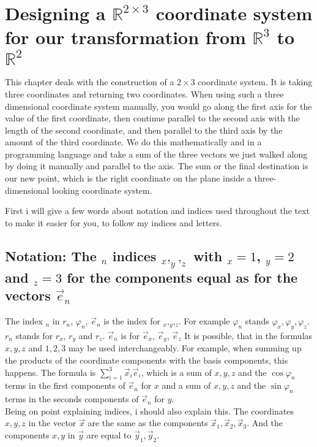 \documentclass[a4paper]{article}
\begin{document}
\section{Designing a $\mathbb{R}^{2\times{3}}$ coordinate system for our transformation from $\mathbb{R}^{3}$ to $\mathbb{R}^{2}$}

This chapter deals with the construction of a $2 \times 3$ coordinate system. It is taking three coordinates and returning two coordinates. When using such a three dimensional coordinate system manually, you would go along the first axis for the value of the first coordinate, then continue parallel to the second axis with the length of the second coordinate, and then parallel to the third axis by the amount of the third coordinate. We do this mathematically and in a programming language and take a sum of the three vectors we just walked along by doing it manually and parallel to the axis. The sum or the final destination is our new point, which is the right coordinate on the plane inside a three-dimensional looking coordinate system.

First i will give a few words about notation and indices used throughout the text to make it easier for you, to follow my indices and letters.

\subsection{Notation: The $_{n}$ indices $_x,_y,_z$ with $_x=1$, $_y=2$ and $_z=3$ for the components equal as for the vectors $\vec{e}_n$}

The index $_{n}$ in $r_{n}$, $\varphi_{n}$, $\vec{e}_{n}$ is the index for $_x$,$_y$,$_z$. For example $\varphi_{n}$  stands $\varphi_x, \varphi_y, \varphi_z$. $r_{n}$ stands for $r_x$, $r_y$ and $r_z$. $\vec{e}_{n}$ is for $\vec{e}_x$, $\vec{e}_y$, $\vec{e}_z$ It is possible, that in the formulas $x,y,z$ and $1,2,3$ may be used interchangeably. For example, when summing up the products of the coordinate components with the basis components, this happens. The formula is $\sum_{i=1}^{3}\vec{x}_{i}\vec{e}_{i}$, which is a sum of $x,y,z$ and the $\cos \varphi_{n}$ terms in the first components of $\vec{e}_{n}$ for $x$ and a sum of $x,y,z$ and the $\sin \varphi_{n}$ terms in the seconds components of $\vec{e}_{n}$ for $y$.\\

Being on point explaining indices, i should also explain this. The coordinates $x,y,z$ in the vector $\vec{x}$ are the same as the components $\vec{x}_{1},\vec{x}_{2},\vec{x}_{3}$. And the components $x, y$ in $\vec{y}$ are equal to $\vec{y}_{1}, \vec{y}_{2}$.\\
\end{document}
